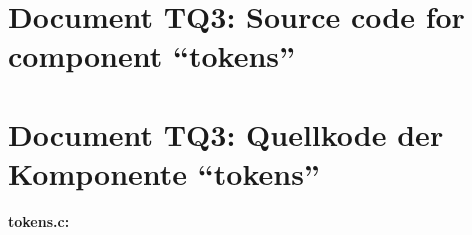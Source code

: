\pagestyle{myheadings}
\ifenglish
{}
\fi
\ifgerman
{}
\fi

\parindent0pt

\ifenglish
\section*{Document TQ3: Source code for component ``tokens''}
\fi
\ifgerman
\section*{Document TQ3: Quellkode der Komponente "`tokens"'}
\fi

{\bf tokens.c:}
\smallskip




